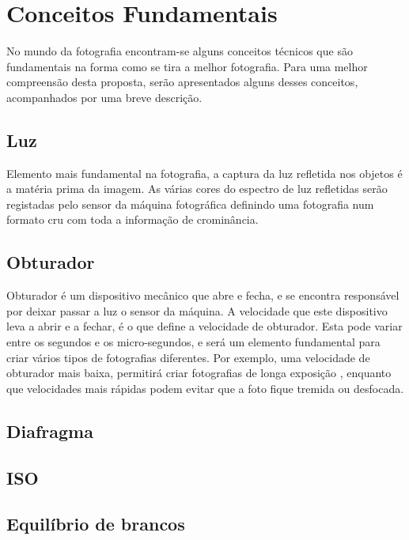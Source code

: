 
\chapter{Conceitos Fundamentais}
\label{cha:concepts}

No mundo da fotografia encontram-se alguns conceitos técnicos que são fundamentais na forma como se tira a melhor fotografia. Para uma melhor compreensão desta proposta, serão apresentados alguns desses conceitos, acompanhados por uma breve descrição.


\section*{Luz}

Elemento mais fundamental na fotografia, a captura da luz refletida nos objetos é a matéria prima da imagem. As várias cores do espectro de luz refletidas serão registadas pelo sensor da máquina fotográfica definindo uma fotografia num formato cru com toda a informação de crominância.

\section*{Obturador}

Obturador é um dispositivo mecânico que abre e fecha, e se encontra responsável por deixar passar a luz o sensor da máquina. A velocidade que este dispositivo leva a abrir e a fechar, é o que define a velocidade de obturador. Esta pode variar entre os segundos e os micro-segundos, e será um elemento fundamental para criar vários tipos de fotografias diferentes. Por exemplo, uma velocidade de obturador mais baixa, permitirá criar fotografias de longa exposição , enquanto que velocidades mais rápidas podem evitar que a foto fique tremida ou desfocada.

\section*{Diafragma}



\section*{ISO}
\section*{Equilíbrio de brancos}

